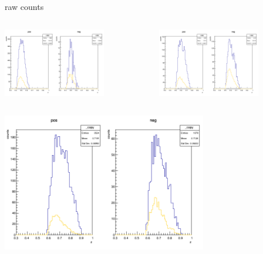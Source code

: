 \begin{frame}{raw counts}
\begin{columns}
\begin{column}[T]{0.5\textwidth}
\includegraphics[width = 0.7\textwidth]{results/yield/statistics/counts_x_Q2_z_0.40_4.000_0.50.png}
\end{column}
\begin{column}[T]{0.5\textwidth}
\includegraphics[width = 0.7\textwidth]{results/yield/statistics/counts_x_Q2_z_0.40_4.000_0.60.png}
\end{column}
\end{columns}
\begin{columns}
\begin{column}[T]{0.5\textwidth}
\includegraphics[width = 0.7\textwidth]{results/yield/statistics/counts_x_Q2_z_0.40_4.000_0.70.png}
\end{column}
\begin{column}[T]{0.5\textwidth}
\end{column}
\end{columns}
\end{frame}
